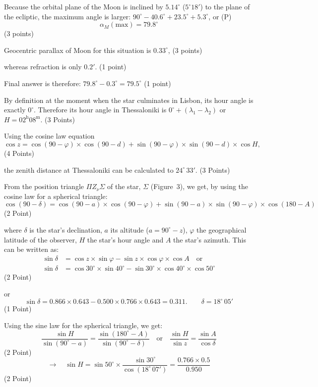 Because the orbital plane of the Moon is inclined by $5.14^\circ$
($5^\circ 18'$) to the plane of the ecliptic, the maximum angle is larger:
$90^\circ - 40.6^\circ + 23.5^\circ + 5.3^\circ$, or (P) %
\[ \alpha_M(\mathrm{max}) = 79.8^\circ \]
\hfill(3 points)

Geocentric parallax of Moon for this situation is $0.33^\circ$,
\hfill(3 points)

whereas refraction is only $0.2'$. \hfill(1 point)

Final answer is therefore: $79.8^\circ - 0.3^\circ = 79.5^\circ$
\hfill(1 point)

By definition at the moment when the star culminates in Lisbon, its hour
angle is exactly $0^\circ$. Therefore its hour angle in Thessaloniki is
$0^\circ + (\lambda_1 - \lambda_2)$ or
$H = 02^{\mathrm{h}}08^{\mathrm{m}}$. \hfill(3 Points)

Using the cosine law equation
\[ \cos z = \cos(90-\varphi)\times\cos(90-d)
   + \sin(90-\varphi)\times\sin(90-d)\times\cos H, \]
\hfill(4 Points)

the zenith distance at Thessaloniki can be calculated to
$24^\circ\,33'$. \hfill(3 Points)

From the position triangle $\Pi Z_\nu \Sigma$ of the star, $\Sigma$
(Figure~3), we get, by using the cosine law for a spherical triangle:
\[ \cos(90-\delta) = \cos(90-a)\times\cos(90-\varphi)
   + \sin(90-a)\times\sin(90-\varphi)\times\cos(180-A) \]
\hfill(2 Point)

where $\delta$ is the star's declination, $a$ its altitude
($a = 90^\circ - z$), $\varphi$ the geographical latitude of the observer,
$H$ the star's hour angle and $A$ the star's azimuth. This can be written as:
\begin{align*}
\sin\delta &= \cos z \times \sin\varphi - \sin z \times \cos\varphi \times \cos A
  \quad\text{or}\\
\sin\delta &= \cos 30^\circ \times \sin 40^\circ
  - \sin 30^\circ \times \cos 40^\circ \times \cos 50^\circ
\end{align*}
\hfill(2 Point)

or
\[ \sin\delta = 0.866\times 0.643 - 0.500\times 0.766\times 0.643 = 0.311.
   \qquad \delta = 18^\circ\,05' \]
\hfill(1 Point)

Using the sine law for the spherical triangle, we get:
\[ \frac{\sin H}{\sin(90^\circ - a)} = \frac{\sin(180^\circ - A)}{\sin(90^\circ - \delta)}
   \quad\text{or}\quad
   \frac{\sin H}{\sin z} = \frac{\sin A}{\cos\delta} \]
\hfill(2 Point)
\[ \rightarrow\quad
   \sin H = \sin 50^\circ \times \frac{\sin 30^\circ}{\cos(18^\circ\,07')}
   = \frac{0.766\times 0.5}{0.950} \]
\hfill(2 Point)

